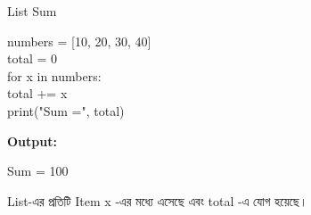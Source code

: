 \begin{codeoutputbox}{List Sum}

\noindent
\begin{minipage}[t]{0.53\linewidth}
\codeheading

\begin{english}
\ttfamily
numbers = [10, 20, 30, 40]\\
total = 0\\[0.5mm]
for x in numbers:\\
\hspace*{4mm}total += x\\[0.5mm]
print("Sum =", total)
\end{english}

\end{minipage}
\hfill
\begin{minipage}[t]{0.43\linewidth}
\outputheading

\textbf{Output:}

\begin{center}
\textenglish{\ttfamily Sum = 100}
\end{center}

List-এর প্রতিটি Item
\textenglish{\ttfamily x}
-এর মধ্যে এসেছে এবং
\textenglish{\ttfamily total}
-এ যোগ হয়েছে।

\end{minipage}

\end{codeoutputbox}




